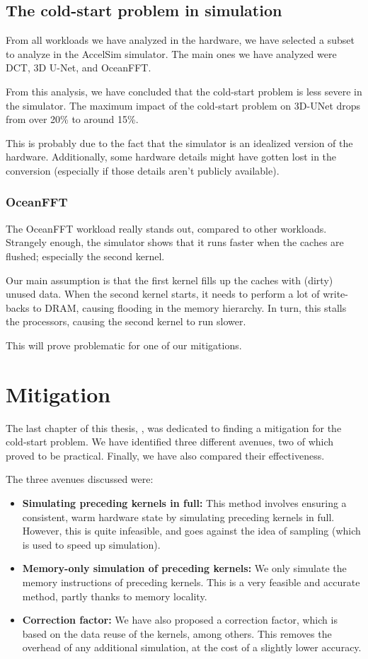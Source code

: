 \subsection{The cold-start problem in simulation}\label{subsec:cold-start-in-simulation}
From all workloads we have analyzed in the hardware, we have selected a subset to analyze in the AccelSim simulator.
The main ones we have analyzed were DCT, 3D U-Net, and OceanFFT\@.

From this analysis, we have concluded that the cold-start problem is less severe in the simulator.
The maximum impact of the cold-start problem on 3D-UNet drops from over 20\% to around 15\%.

This is probably due to the fact that the simulator is an idealized version of the hardware.
Additionally, some hardware details might have gotten lost in the conversion (especially if those details aren't publicly available).

\subsubsection{OceanFFT}\label{subsubsec:oceanfft}
The OceanFFT workload really stands out, compared to other workloads.
Strangely enough, the simulator shows that it runs faster when the caches are flushed; especially the second kernel.

Our main assumption is that the first kernel fills up the caches with (dirty) unused data.
When the second kernel starts, it needs to perform a lot of write-backs to DRAM, causing flooding in the memory hierarchy.
In turn, this stalls the processors, causing the second kernel to run slower.

This will prove problematic for one of our mitigations.

\section{Mitigation}\label{sec:mitigation}
The last chapter of this thesis, , was dedicated to finding a mitigation for the cold-start problem.
We have identified three different avenues, two of which proved to be practical.
Finally, we have also compared their effectiveness.

The three avenues discussed were:
\begin{itemize}
    \item \textbf{Simulating preceding kernels in full:} This method involves ensuring a consistent, warm hardware state by simulating preceding kernels in full.
    However, this is quite infeasible, and goes against the idea of sampling (which is used to speed up simulation).
    \item \textbf{Memory-only simulation of preceding kernels:} We only simulate the memory instructions of preceding kernels.
    This is a very feasible and accurate method, partly thanks to memory locality.
    \item \textbf{Correction factor:} We have also proposed a correction factor, which is based on the data reuse of the kernels, among others.
    This removes the overhead of any additional simulation, at the cost of a slightly lower accuracy.
\end{itemize}


